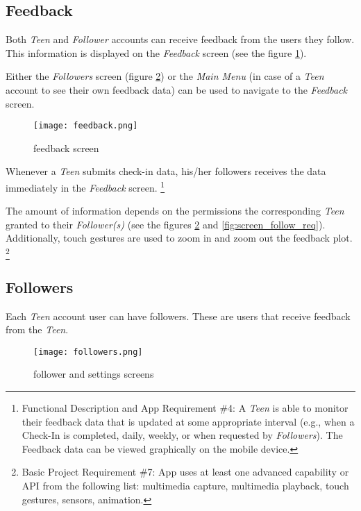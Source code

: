 \documentclass{article}
\begin{document}
\newpage

    \subsection{Feedback}

    Both \emph{Teen} and \emph{Follower} accounts can receive feedback from the users they follow. This information is displayed on the \emph{Feedback} screen (see the figure \ref{fig:screen_feedback}).
    
    Either the \emph{Followers} screen (figure \ref{fig:screen_followers}) or the \emph{Main Menu} (in case of a \emph{Teen} account to see their own feedback data) can be used to navigate to the \emph{Feedback} screen. 

    \begin{figure}[h]
        \centering
        \texttt{[image: feedback.png]}
        \caption{feedback screen}
        \label{fig:screen_feedback}
    \end{figure}
    
    Whenever a \emph{Teen} submits check-in data, his/her followers receives the data immediately in the \emph{Feedback} screen. 
    \footnote{Functional Description and App Requirement \#4: A \emph{Teen} is able to monitor their feedback data that is updated at some appropriate interval (e.g., when a Check-In is completed, daily, weekly, or when requested by \emph{Followers}). The Feedback data can be viewed graphically on the mobile device.}

    The amount of information depends on the permissions the corresponding \emph{Teen} granted to their \emph{Follower(s)} (see the figures \ref{fig:screen_followers} and \ref{fig:screen_follow_req}). Additionally, touch gestures are used to zoom in and zoom out the feedback plot.
    \footnote{Basic Project Requirement \#7: App uses at least one advanced capability or API from the following list: multimedia capture, multimedia playback, touch gestures, sensors, animation.}

\newpage

    \subsection{Followers}

    Each \emph{Teen} account user can have followers. These are users that receive feedback from the \emph{Teen}.

    \begin{figure}[h]
        \centering
        \texttt{[image: followers.png]}
        \caption{follower and settings screens}
        \label{fig:screen_followers}
    \end{figure}
\end{document}
